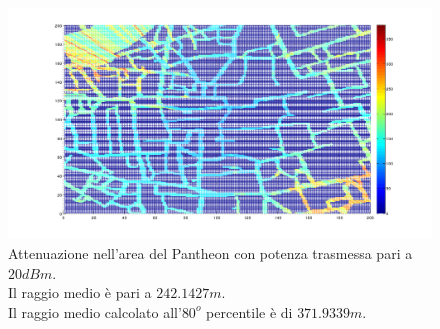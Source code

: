 \begin{figure}
\centering
\includegraphics[height=0.5\textwidth]{Immagini/Pantheon/attenuazione_femto}
\caption{Attenuazione nell'area del Pantheon con potenza trasmessa pari a $20dBm$. \\
Il raggio medio è pari a $242.1427 m$.\\
Il raggio medio calcolato all'$80^o$ percentile è di $371.9339 m$.}
\label{img:attpantheonfemto}
\end{figure}